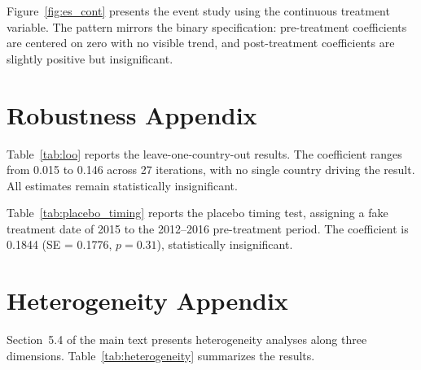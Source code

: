 \documentclass[12pt]{article}
\begin{document}
Figure~\ref{fig:es_cont} presents the event study using the continuous treatment variable. The pattern mirrors the binary specification: pre-treatment coefficients are centered on zero with no visible trend, and post-treatment coefficients are slightly positive but insignificant.


\section{Robustness Appendix}
\label{app:robustness}



Table~\ref{tab:loo} reports the leave-one-country-out results. The coefficient ranges from 0.015 to 0.146 across 27 iterations, with no single country driving the result. All estimates remain statistically insignificant.



Table~\ref{tab:placebo_timing} reports the placebo timing test, assigning a fake treatment date of 2015 to the 2012--2016 pre-treatment period. The coefficient is 0.1844 (SE = 0.1776, $p = 0.31$), statistically insignificant.


\section{Heterogeneity Appendix}
\label{app:heterogeneity}

Section~5.4 of the main text presents heterogeneity analyses along three dimensions. Table~\ref{tab:heterogeneity} summarizes the results.
\end{document}
